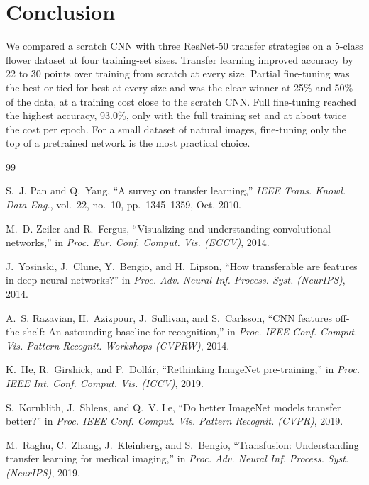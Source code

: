 \documentclass[journal]{IEEEtran}
\begin{document}
\section{Conclusion}
We compared a scratch CNN with three ResNet-50 transfer strategies on a 5-class flower dataset at four training-set sizes. Transfer learning improved accuracy by 22 to 30 points over training from scratch at every size. Partial fine-tuning was the best or tied for best at every size and was the clear winner at 25\% and 50\% of the data, at a training cost close to the scratch CNN. Full fine-tuning reached the highest accuracy, 93.0\%, only with the full training set and at about twice the cost per epoch. For a small dataset of natural images, fine-tuning only the top of a pretrained network is the most practical choice.

\begin{thebibliography}{99}

S.~J. Pan and Q.~Yang, ``A survey on transfer learning,'' \textit{IEEE Trans. Knowl. Data Eng.}, vol.~22, no.~10, pp.~1345--1359, Oct. 2010.

M.~D. Zeiler and R.~Fergus, ``Visualizing and understanding convolutional networks,'' in \textit{Proc. Eur. Conf. Comput. Vis. (ECCV)}, 2014.

J.~Yosinski, J.~Clune, Y.~Bengio, and H.~Lipson, ``How transferable are features in deep neural networks?'' in \textit{Proc. Adv. Neural Inf. Process. Syst. (NeurIPS)}, 2014.

A.~S. Razavian, H.~Azizpour, J.~Sullivan, and S.~Carlsson, ``CNN features off-the-shelf: An astounding baseline for recognition,'' in \textit{Proc. IEEE Conf. Comput. Vis. Pattern Recognit. Workshops (CVPRW)}, 2014.

K.~He, R.~Girshick, and P.~Doll\'{a}r, ``Rethinking ImageNet pre-training,'' in \textit{Proc. IEEE Int. Conf. Comput. Vis. (ICCV)}, 2019.

S.~Kornblith, J.~Shlens, and Q.~V. Le, ``Do better ImageNet models transfer better?'' in \textit{Proc. IEEE Conf. Comput. Vis. Pattern Recognit. (CVPR)}, 2019.

M.~Raghu, C.~Zhang, J.~Kleinberg, and S.~Bengio, ``Transfusion: Understanding transfer learning for medical imaging,'' in \textit{Proc. Adv. Neural Inf. Process. Syst. (NeurIPS)}, 2019.


\end{thebibliography}
\end{document}
